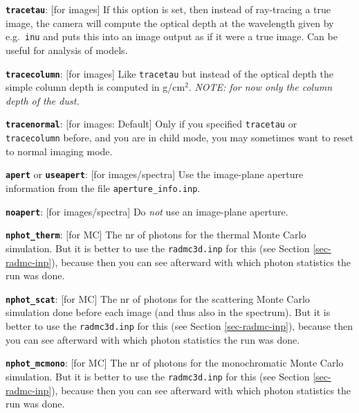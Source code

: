 \documentclass{report}
\newenvironment{options}%
  {\begin{list}{}{%
    \setlength{\topsep}{1em}%
    \setlength{\parskip}{0em}%
    \setlength{\parsep}{0em}%
    \setlength{\itemsep}{1em}%
    \setlength{\rightmargin}{0em}%
    \setlength{\leftmargin}{9em}%
    \setlength{\labelsep}{1em}%
    \setlength{\labelwidth}{6em}%
    \setlength{\itemindent}{0em}}\normalfont}%
  {\end{list}}
\begin{document}
\begin{options}
\item[{\small\tt\bf tracetau}:\hfill] [for images] If this option is set, then instead
  of ray-tracing a true image, the camera will compute the optical depth
  at the wavelength given by e.g.~{\small\tt inu} and puts this into an image
  output as if it were a true image. Can be useful for analysis of models.
\item[{\small\tt\bf tracecolumn}:\hfill] [for images] Like {\small\tt tracetau} but instead
  of the optical depth the simple column depth is computed in g/cm$^2$. {\em
    NOTE: for now only the column depth of the dust.}
\item[{\small\tt\bf tracenormal}:\hfill] [for images: Default] Only if you specified 
  {\small\tt tracetau} or {\small\tt tracecolumn} before, and you are in child mode, 
  you may sometimes want to reset to normal imaging mode.
\item[{\small\tt\bf apert} or {\small\tt\bf useapert}:\hfill] [for
  images/spectra] Use the image-plane aperture information from the file
  {\small\tt aperture\_info.inp}.
\item[{\small\tt\bf noapert}:\hfill] [for images/spectra] Do {\em not} use an image-plane aperture.
\item[{\small\tt\bf nphot\_therm}:\hfill] [for MC] The nr of photons for the thermal
  Monte Carlo simulation. But it is better to use the {\small\tt radmc3d.inp} for this
  (see Section \ref{sec-radmc-inp}), because then you can see afterward with
  which photon statistics the run was done.
\item[{\small\tt\bf nphot\_scat}:\hfill] [for MC] The nr of photons for the
  scattering Monte Carlo simulation done before each image (and thus also in
  the spectrum). But it is better to use the {\small\tt radmc3d.inp} for
  this (see Section \ref{sec-radmc-inp}), because then you can see afterward
  with which photon statistics the run was done.
\item[{\small\tt\bf nphot\_mcmono}:\hfill] [for MC] The nr of photons for
  the monochromatic Monte Carlo simulation. But it is better to use the
  {\small\tt radmc3d.inp} for this (see Section \ref{sec-radmc-inp}),
  because then you can see afterward with which photon statistics the run
  was done.
\end{options}
\end{document}
